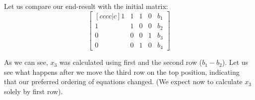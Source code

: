 Let us compare our end-result with the initial matrix:
\begin{equation}
\begin{bmatrix}[cccc|c]
    1 & 1 & 1 & 0 & b_1 \\ 
    1 & 1 & 0 & 0 & b_2 \\ 
    0 & 0 & 0 & 1 & b_3 \\ 
    0 & 0 & 1 & 0 & b_4
\end{bmatrix}
\end{equation}

As we can see, $x_3$ was calculated using first and the second row ($b_1 - b_2$).
Let us see what happens after we move the third row on the top position, indicating that our preferred ordering of equations changed. (We expect now to calculate $x_3$ solely by first row).

